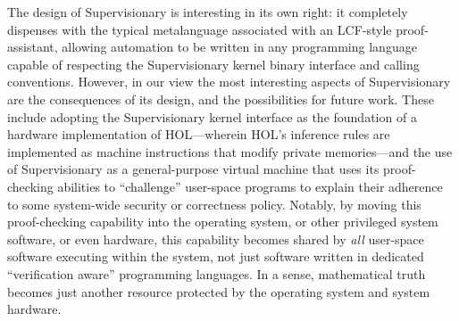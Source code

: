 \documentclass[a4paper, UKenglish, cleveref, autoref, thm-restate, colorlinks]{lipics-v2021}
\begin{document}
The design of Supervisionary is interesting in its own right: it completely dispenses with the typical metalanguage associated with an LCF-style proof-assistant, allowing automation to be written in any programming language capable of respecting the Supervisionary kernel binary interface and calling conventions.
However, in our view the most interesting aspects of Supervisionary are the consequences of its design, and the possibilities for future work.
These include adopting the Supervisionary kernel interface as the foundation of a hardware implementation of HOL---wherein HOL's inference rules are implemented as machine instructions that modify private memories---and the use of Supervisionary as a general-purpose virtual machine that uses its proof-checking abilities to ``challenge'' user-space programs to explain their adherence to some system-wide security or correctness policy.
Notably, by moving this proof-checking capability into the operating system, or other privileged system software, or even hardware, this capability becomes shared by \emph{all} user-space software executing within the system, not just software written in dedicated ``verification aware'' programming languages.
In a sense, mathematical truth becomes just another resource protected by the operating system and system hardware.

\newpage


\end{document}
